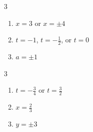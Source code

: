 \documentclass{ximera}
\begin{document}
\begin{multicols}{3}
\begin{enumerate}
\setcounter{enumi}{\value{HW}}

\item $x=3$ or $x = \pm 4$ 
\item $t = -1$, $t= -\frac{1}{2}$, or $t = 0$
\item $a = \pm 1$

\setcounter{HW}{\value{enumi}}
\end{enumerate}
\end{multicols}

\begin{multicols}{3}
\begin{enumerate}
\setcounter{enumi}{\value{HW}}

\item $t = -\frac{3}{4}$ or $t = \frac{3}{2}$
\item $x = \frac{2}{3}$
\item $y = \pm 3$  
\setcounter{HW}{\value{enumi}}
\end{enumerate}
\end{multicols}
\end{document}
